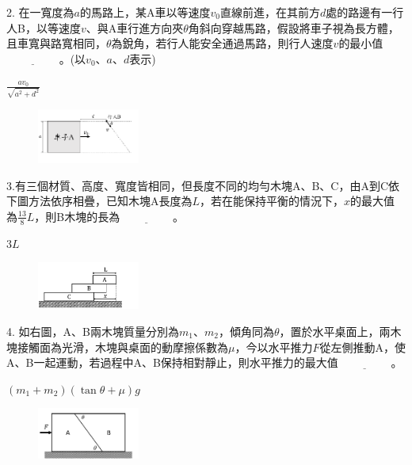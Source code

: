 \documentclass[cn,10pt,math=newtx]{elegantbook}
\begin{document}
\begin{example}
   2. 在一寬度為$a$的馬路上，某A車以等速度$v_0$直線前進，在其前方$d$處的路邊有一行人B，以等速度$v$、與A車行進方向夾$\theta$角斜向穿越馬路，假設將車子視為長方體，且車寬與路寬相同，$\theta$為銳角，若行人能安全通過馬路，則行人速度$v$的最小值$\underline{\hspace{2cm}}$。(以$v_0、a、d$表示)\\
    \rightline{[桃園高中教甄109]}
\end{example}
\begin{solution}
    $\frac{a v_0}{\sqrt{a^2 + d^2}}$
\end{solution}
\begin{figure}[htbp]
    \flushright
    \includegraphics[width=0.3\textwidth]{image/109桃園2.png}
  \end{figure}
\newpage

\begin{example}
   3.有三個材質、高度、寬度皆相同，但長度不同的均勻木塊A、B、C，由A到C依下圖方法依序相疊，已知木塊A長度為$L$，若在能保持平衡的情況下，$x$的最大值為$\frac{13}{8} L$，則B木塊的長為$\underline{\hspace{2cm}}$。\\
    \rightline{[桃園高中教甄109]}
\end{example}
\begin{solution}
    $3L$
\end{solution}
\begin{figure}[htbp]
    \flushright
    \includegraphics[width=0.3\textwidth]{image/109桃園3.png}
  \end{figure}
\newpage

\begin{example}
   4. 如右圖，A、B兩木塊質量分別為$m_1、m_2$，傾角同為$\theta$，置於水平桌面上，兩木塊接觸面為光滑，木塊與桌面的動摩擦係數為$\mu$，今以水平推力$F$從左側推動A，使A、B一起運動，若過程中A、B保持相對靜止，則水平推力的最大值$\underline{\hspace{2cm}}$。\\
    \rightline{[桃園高中教甄109]}
\end{example}
\begin{solution}
    $(m_1+m_2) (\tan{\theta}+\mu) g$
\end{solution}
\begin{figure}[htbp]
    \flushright
    \includegraphics[width=0.3\textwidth]{image/109桃園4.png}
  \end{figure}
\newpage
\end{document}
